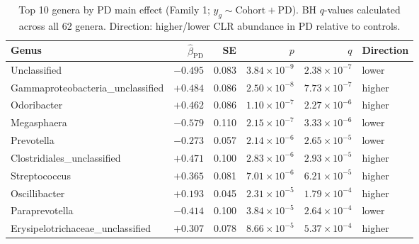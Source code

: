 \documentclass[12pt,a4paper]{article}
\begin{document}
\begin{table}[h]
\centering
\caption{Top 10 genera by PD main effect (Family 1; $y_g \sim
\mathrm{Cohort} + \mathrm{PD}$). BH $q$-values calculated across all 62
genera. Direction: higher/lower CLR abundance in PD relative to controls.}
\label{tab:main-effect-top}
\begin{tabular}{lrrrrl}
\toprule
Genus & $\hat\beta_{\mathrm{PD}}$ & SE &
  $p$ & $q$ & Direction \\
\midrule
Unclassified                     & $-0.495$ & 0.083 & $3.84\times10^{-9}$ & $2.38\times10^{-7}$ & lower  \\
Gammaproteobacteria\_unclassified&  $+0.484$ & 0.086 & $2.50\times10^{-8}$ & $7.73\times10^{-7}$ & higher \\
Odoribacter                      &  $+0.462$ & 0.086 & $1.10\times10^{-7}$ & $2.27\times10^{-6}$ & higher \\
Megasphaera                      & $-0.579$ & 0.110 & $2.15\times10^{-7}$ & $3.33\times10^{-6}$ & lower  \\
Prevotella                       & $-0.273$ & 0.057 & $2.14\times10^{-6}$ & $2.65\times10^{-5}$ & lower  \\
Clostridiales\_unclassified      &  $+0.471$ & 0.100 & $2.83\times10^{-6}$ & $2.93\times10^{-5}$ & higher \\
Streptococcus                    &  $+0.365$ & 0.081 & $7.01\times10^{-6}$ & $6.21\times10^{-5}$ & higher \\
Oscillibacter                    &  $+0.193$ & 0.045 & $2.31\times10^{-5}$ & $1.79\times10^{-4}$ & higher \\
Paraprevotella                   & $-0.414$ & 0.100 & $3.84\times10^{-5}$ & $2.64\times10^{-4}$ & lower  \\
Erysipelotrichaceae\_unclassified&  $+0.307$ & 0.078 & $8.66\times10^{-5}$ & $5.37\times10^{-4}$ & higher \\
\bottomrule
\end{tabular}
\end{table}
\end{document}
